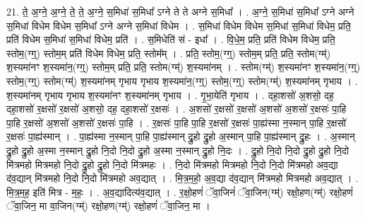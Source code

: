 \documentclass[17pt]{extarticle}
\begin{document}
21. ते॒ अ॒ग्ने॒ अ॒ग्ने॒ ते॒ ते॒ अ॒ग्ने॒ स॒मिधा॑ स॒मिधा᳚ ऽग्ने ते ते अग्ने स॒मिधा᳚ । . अ॒ग्ने॒ स॒मिधा॑ स॒मिधा᳚ ऽग्ने अग्ने स॒मिधा॑ विधेम विधेम स॒मिधा᳚ ऽग्ने अग्ने स॒मिधा॑ विधेम । . स॒मिधा॑ विधेम विधेम स॒मिधा॑ स॒मिधा॑ विधेम॒ प्रति॒ प्रति॑ विधेम स॒मिधा॑ स॒मिधा॑ विधेम॒ प्रति॑ । . स॒मिधेति॑ सं - इधा᳚ । . वि॒धे॒म॒ प्रति॒ प्रति॑ विधेम विधेम॒ प्रति॒ स्तोम॒(ग्ग्॒) स्तोम॒म् प्रति॑ विधेम विधेम॒ प्रति॒ स्तोम᳚म् । . प्रति॒ स्तोम॒(ग्ग्॒) स्तोम॒म् प्रति॒ प्रति॒ स्तोम(ग्म्॑) श॒स्यमा॑नꣳ श॒स्यमा॑न॒(ग्ग्॒) स्तोम॒म् प्रति॒ प्रति॒ स्तोम(ग्म्॑) श॒स्यमा॑नम् । . स्तोम(ग्म्॑) श॒स्यमा॑नꣳ श॒स्यमा॑न॒(ग्ग्॒) स्तोम॒(ग्ग्॒) स्तोम(ग्म्॑) श॒स्यमा॑नम् गृभाय गृभाय श॒स्यमा॑न॒(ग्ग्॒) स्तोम॒(ग्ग्॒) स्तोम(ग्म्॑) श॒स्यमा॑नम् गृभाय । . श॒स्यमा॑नम् गृभाय गृभाय श॒स्यमा॑नꣳ श॒स्यमा॑नम् गृभाय । . गृ॒भा॒येति॑ गृभाय । . दहा॒शसो॑ अ॒शसो॒ दह॒ दहा॒शसो॑ र॒क्षसो॑ र॒क्षसो॑ अ॒शसो॒ दह॒ दहा॒शसो॑ र॒क्षसः॑ । . अ॒शसो॑ र॒क्षसो॑ र॒क्षसो॑ अ॒शसो॑ अ॒शसो॑ र॒क्षसः॑ पा॒हि पा॒हि र॒क्षसो॑ अ॒शसो॑ अ॒शसो॑ र॒क्षसः॑ पा॒हि । . र॒क्षसः॑ पा॒हि पा॒हि र॒क्षसो॑ र॒क्षसः॑ पा॒ह्य॑स्मा न॒स्मान् पा॒हि र॒क्षसो॑ र॒क्षसः॑ पा॒ह्य॑स्मान् । . पा॒ह्य॑स्मा न॒स्मान् पा॒हि पा॒ह्य॑स्मान् द्रु॒हो द्रु॒हो अ॒स्मान् पा॒हि पा॒ह्य॑स्मान् द्रु॒हः । . अ॒स्मान् द्रु॒हो द्रु॒हो अ॒स्मा न॒स्मान् द्रु॒हो नि॒दो नि॒दो द्रु॒हो अ॒स्मा न॒स्मान् द्रु॒हो नि॒दः । . द्रु॒हो नि॒दो नि॒दो द्रु॒हो द्रु॒हो नि॒दो मि॑त्रमहो मित्रमहो नि॒दो द्रु॒हो द्रु॒हो नि॒दो मि॑त्रमहः । . नि॒दो मि॑त्रमहो मित्रमहो नि॒दो नि॒दो मि॑त्रमहो अव॒द्या द॑व॒द्यान् मि॑त्रमहो नि॒दो नि॒दो मि॑त्रमहो अव॒द्यात् । . मि॒त्र॒म॒हो॒ अ॒व॒द्या द॑व॒द्यान् मि॑त्रमहो मित्रमहो अव॒द्यात् । . मि॒त्र॒म॒ह॒ इति॑ मित्र - म॒हः॒ । . अ॒व॒द्यादित्य॑व॒द्यात् । . र॒क्षो॒हणं॑ ॅवा॒जिनं॑ ॅवा॒जिन(ग्म्॑) रक्षो॒हण(ग्म्॑) रक्षो॒हणं॑ ॅवा॒जिन॒ मा वा॒जिन(ग्म्॑) रक्षो॒हण(ग्म्॑) रक्षो॒हणं॑ ॅवा॒जिन॒ मा । \newline
\end{document}
